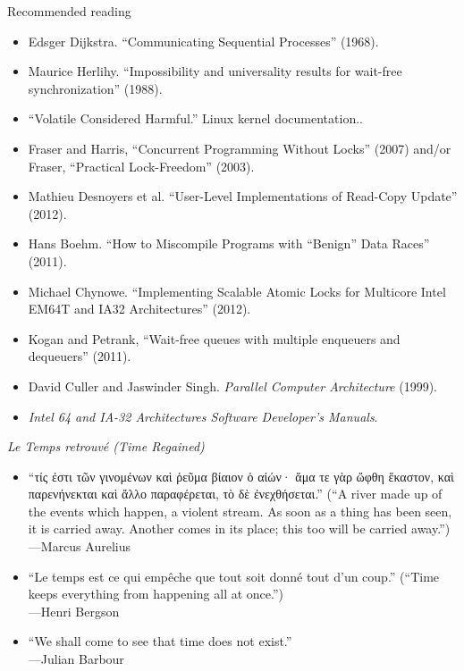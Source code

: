 \documentclass[xcolor={dvipsnames,table}]{beamer}
\begin{document}
\begin{frame}{Recommended reading}
\small
\begin{itemize}
\item Edsger Dijkstra. ``Communicating Sequential Processes'' (1968).
\item Maurice Herlihy. ``Impossibility and universality results for wait-free synchronization'' (1988).
\item ``Volatile Considered Harmful.'' Linux kernel documentation..
\item Fraser and Harris, ``Concurrent Programming Without Locks'' (2007) and/or Fraser,
	``Practical Lock-Freedom'' (2003).
\item Mathieu Desnoyers et al. ``User-Level Implementations of Read-Copy Update'' (2012).
\item Hans Boehm. ``How to Miscompile Programs with ``Benign'' Data Races'' (2011).
\item Michael Chynowe. ``Implementing Scalable Atomic Locks for Multicore Intel EM64T and IA32 Architectures'' (2012).
\item Kogan and Petrank, ``Wait-free queues with multiple enqueuers and dequeuers'' (2011).
\item David Culler and Jaswinder Singh. \textit{Parallel Computer Architecture} (1999). 
\item \textit{Intel 64 and IA-32 Architectures Software Developer's Manuals}.
\end{itemize}
\end{frame}

\begin{frame}{\textit{Le Temps retrouvé (Time Regained)}}
\begin{itemize}
\item `` τίς ἐστι τῶν γινομένων καὶ ῥεῦμα βίαιον ὁ αἰών· ἅμα
τε γὰρ ὤφθη ἕκαστον, καὶ παρενήνεκται καὶ ἄλλο παραφέρεται, τὸ δὲ
ἐνεχθήσεται.\latintext'' (``A river made up of the events which
happen, a violent stream. As soon as a thing has been seen, it is
carried away. Another comes in its place; this too will be carried away.'')\\ \hfill---Marcus Aurelius
\vspace{.1in}
\item {}``Le temps est ce qui empêche que tout soit donné tout d'un coup.'' \latintext (``Time
	keeps everything from happening all at once.'')\\ \hfill---Henri Bergson
\vspace{.1in}
\item ``We shall come to see that time does not exist.''\\ \hfill---Julian Barbour
\end{itemize}
\end{frame}
\end{document}
